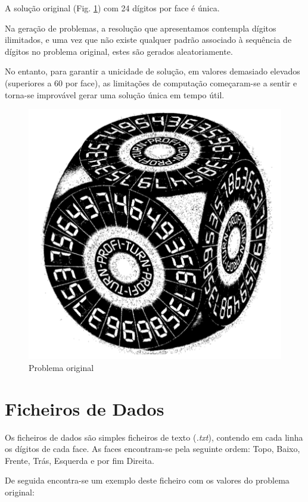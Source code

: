 A solução original (Fig. \ref{fig:1}) com 24 dígitos por face é única.

Na geração de problemas, a resolução que apresentamos contempla dígitos ilimitados, e uma vez que não existe qualquer padrão associado à sequência de dígitos no problema original, estes são gerados aleatoriamente.

No entanto, para garantir a unicidade de solução, em valores demasiado elevados (superiores a 60 por face), as limitações de computação começaram-se a sentir e torna-se improvável gerar uma solução única em tempo útil.

\begin{figure}[H]
\begin{center}
\includegraphics[scale=0.4]{turn12.png}
\caption{Problema original}
\label{fig:1}
\end{center}
\end{figure}



\section{Ficheiros de Dados}
\label{data:1}

Os ficheiros de dados são simples ficheiros de texto (\textit{.txt}), contendo em cada linha os dígitos de cada face.
As faces encontram-se pela seguinte ordem: Topo, Baixo, Frente, Trás, Esquerda e por fim Direita.

De seguida encontra-se um exemplo deste ficheiro com os valores do problema original:

